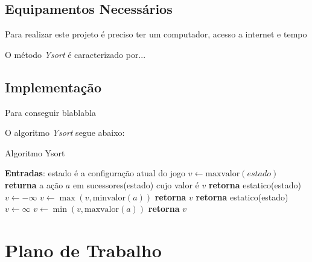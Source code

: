 \documentclass[a4paper,10pt]{article}  %
\begin{document}
\subsection{Equipamentos Necessários}


Para realizar este projeto é preciso ter um computador, acesso a internet e tempo


O método \emph{Ysort} é caracterizado por...

\subsection{Implementação}

Para conseguir blablabla

O algoritmo \textit{Ysort} segue abaixo:

\begin{algorithm}
\caption{Algoritmo Ysort}\label{alg:ysort}
\begin{algorithmic}[1]
\State \textbf{Entradas}: estado é a configuração atual do jogo
\State $v\gets \mathrm{maxvalor}{(estado)}$
\State \textbf{returna} a ação $a$ em sucessores(estado) cujo valor é $v$ %
\EndFunction
{}
   \State \textbf{retorna} estatico(estado)
\EndIf
\State $v \gets -\infty$
    \State $v \gets \max{(v, \mathrm{minvalor}(a))}$
\EndFor
\State \textbf{retorna} $v$
\EndFunction
{}
   \State \textbf{retorna} estatico(estado)
\EndIf
\State $v \gets \infty$
    \State $v \gets \min{(v, \mathrm{maxvalor}(a))}$
\EndFor
\State \textbf{retorna} $v$
\EndFunction
\end{algorithmic}
\end{algorithm}

\section{Plano de Trabalho}
\end{document}
